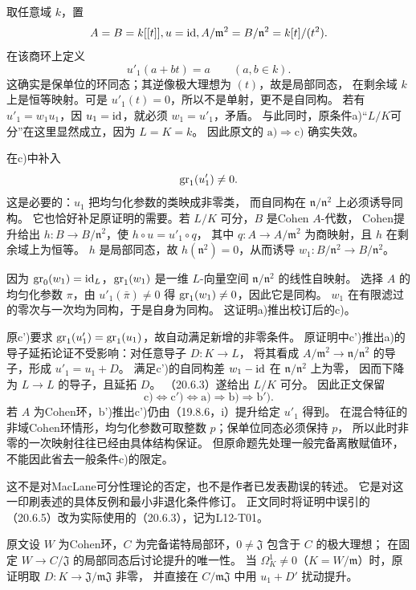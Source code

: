 取任意域 $k$，置
\[
 A=B=k[[t]], u=\mathrm{id},
  A/\mathfrak m^2=B/\mathfrak n^2=k[t]/(t^2).
\]
在该商环上定义
\[
 u'_1(a+bt)=a\qquad(a,b\in k).
\]
这确实是保单位的环同态；其逆像极大理想为 $(t)$，故是局部同态，
在剩余域 $k$ 上是恒等映射。可是 $u'_1(t)=0$，所以不是单射，更不是自同构。
若有 $u'_1=w_1u_1$，因 $u_1=\mathrm{id}$，就必须 $w_1=u'_1$，矛盾。
与此同时，原条件a)“$L/K$可分”在这里显然成立，因为 $L=K=k$。
因此原文的 $\mathrm a)\Rightarrow\mathrm c)$ 确实失效。

在c)中补入
\[
 \operatorname{gr}_1(u'_1)\ne0.
\]
这是必要的：$u_1$ 把均匀化参数的类映成非零类，
而自同构在 $\mathfrak n/\mathfrak n^2$ 上必须诱导同构。
它也恰好补足原证明的需要。若 $L/K$ 可分，$B$ 是Cohen $A$-代数，
Cohen提升给出 $h:B\to B/\mathfrak n^2$，使 $h\circ u=u'_1\circ q$，
其中 $q:A\to A/\mathfrak m^2$ 为商映射，且 $h$ 在剩余域上为恒等。
$h$ 是局部同态，故 $h(\mathfrak n^2)=0$，从而诱导 $w_1:B/\mathfrak n^2\to B/\mathfrak n^2$。

因为 $\operatorname{gr}_0(w_1)=\mathrm{id}_L$，$\operatorname{gr}_1(w_1)$ 是一维 $L$-向量空间
$\mathfrak n/\mathfrak n^2$ 的线性自映射。
选择 $A$ 的均匀化参数 $\pi$，由 $u'_1(\bar\pi)\ne0$ 得
$\operatorname{gr}_1(w_1)\ne0$，因此它是同构。
$w_1$ 在有限滤过的零次与一次均为同构，于是自身为同构。
这证明a)推出校订后的c)。

原c')要求 $\operatorname{gr}_1(u'_1)=\operatorname{gr}_1(u_1)$，故自动满足新增的非零条件。
原证明中c')推出a)的导子延拓论证不受影响：对任意导子 $D:K\to L$，
将其看成 $A/\mathfrak m^2\to\mathfrak n/\mathfrak n^2$ 的导子，形成 $u'_1=u_1+D$。
满足c')的自同构差 $w_1-\mathrm{id}$ 在 $\mathfrak n/\mathfrak n^2$ 上为零，
因而下降为 $L\to L$ 的导子，且延拓 $D$。
（20.6.3）遂给出 $L/K$ 可分。
因此正文保留
\[
 \mathrm c)\Longleftrightarrow\mathrm c')\Longleftrightarrow\mathrm a)
 \Longrightarrow\mathrm b)\Longrightarrow\mathrm b').
\]
若 $A$ 为Cohen环，b')推出c')仍由（19.8.6，i）提升给定 $u'_1$ 得到。
在混合特征的非域Cohen环情形，均匀化参数可取整数 $p$；保单位同态必须保持 $p$，
所以此时非零的一次映射往往已经由具体结构保证。
但原命题先处理一般完备离散赋值环，不能因此省去一般条件c)的限定。

这不是对MacLane可分性理论的否定，也不是作者已发表勘误的转述。
它是对这一印刷表述的具体反例和最小非退化条件修订。
正文同时将证明中误引的（20.6.5）改为实际使用的（20.6.3），记为L12-T01。

原文设 $W$ 为Cohen环，$C$ 为完备诺特局部环，$0\ne\mathfrak J$ 包含于 $C$ 的极大理想；
在固定 $W\to C/\mathfrak J$ 的局部同态后讨论提升的唯一性。
当 $\Omega^1_K\ne0$（$K=W/\mathfrak m$）时，原证明取
$D:K\to\mathfrak J/\mathfrak m\mathfrak J$ 非零，
并直接在 $C/\mathfrak m\mathfrak J$ 中用 $u_1+D'$ 扰动提升。

